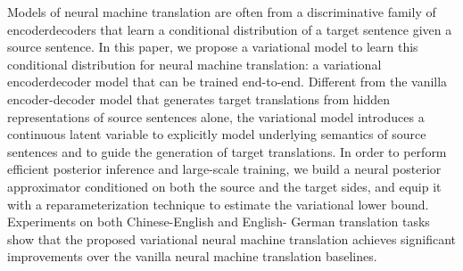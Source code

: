 Models of neural machine translation are often from a discriminative family of encoderdecoders that learn a conditional distribution of a target sentence given a source sentence. In this paper, we propose a variational model to learn this conditional distribution for neural machine translation: a variational encoderdecoder model that can be trained end-to-end. Different from the vanilla encoder-decoder model that generates target translations from hidden representations of source sentences alone, the variational model introduces a continuous latent variable to explicitly model underlying semantics of source sentences and to guide the generation of target translations. In order to perform efficient posterior inference and large-scale training, we build a neural posterior approximator conditioned on both the source and the target sides, and equip it with a reparameterization technique to estimate the variational lower bound. Experiments on both Chinese-English and English- German translation tasks show that the proposed variational neural machine translation achieves significant improvements over the vanilla neural machine translation baselines.
